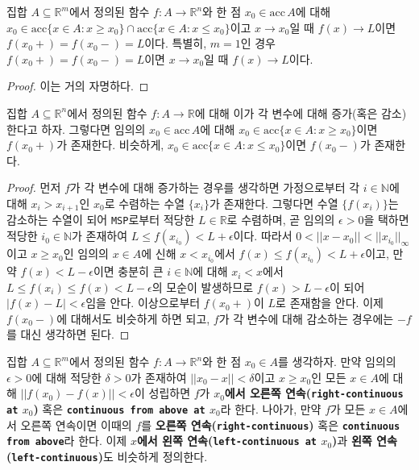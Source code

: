 \begin{proposition}
    집합 $A\subseteq\mathbb{R}^m$에서 정의된 함수 $f:A\to\mathbb{R}^n$와 한 점 $x_0\in\mathrm{acc}\,A$에 대해 $x_0\in\mathrm{acc}\{x\in A:x\geq x_0\}\cap\mathrm{acc}\{x\in A:x\leq x_0\}$이고 $x\to x_0$일 때 $f(x)\to L$이면 $f(x_0+)=f(x_0-)=L$이다. 특별히, $m=1$인 경우 $f(x_0+)=f(x_0-)=L$이면 $x\to x_0$일 때 $f(x)\to L$이다.
\end{proposition}

\begin{proof}
    이는 거의 자명하다.
\end{proof}

\begin{theorem}
    집합 $A\subseteq\mathbb{R}^n$에서 정의된 함수 $f:A\to\mathbb{R}$에 대해 이가 각 변수에 대해 증가(혹은 감소)한다고 하자. 그렇다면 임의의 $x_0\in\mathrm{acc}\,A$에 대해 $x_0\in\mathrm{acc}\{x\in A:x\geq x_0\}$이면 $f(x_0+)$가 존재한다. 비슷하게, $x_0\in\mathrm{acc}\{x\in A:x\leq x_0\}$이면 $f(x_0-)$가 존재한다.
\end{theorem}

\begin{proof}
    먼저 $f$가 각 변수에 대해 증가하는 경우를 생각하면 가정으로부터 각 $i\in\mathbb{N}$에 대해 $x_i>x_{i+1}$인 $x_0$로 수렴하는 수열 $\{x_i\}$가 존재한다. 그렇다면 수열 $\{f(x_i)\}$는 감소하는 수열이 되어 \texttt{MSP}로부터 적당한 $L\in\mathbb{R}$로 수렴하며, 곧 임의의 $\epsilon>0$을 택하면 적당한 $i_0\in\mathbb{N}$가 존재하여 $L\leq f(x_{i_0})<L+\epsilon$이다. 따라서 $0<||x-x_0||<||x_{i_0}||_\infty$이고 $x\geq x_0$인 임의의 $x\in A$에 신해 $x<x_{i_0}$에서 $f(x)\leq f(x_{i_0})<L+\epsilon$이고, 만약 $f(x)<L-\epsilon$이면 충분히 큰 $i\in\mathbb{N}$에 대해 $x_i<x$에서 $L\leq f(x_i)\leq f(x)<L-\epsilon$의 모순이 발생하므로 $f(x)>L-\epsilon$이 되어 $|f(x)-L|<\epsilon$임을 안다. 이상으로부터 $f(x_0+)$이 $L$로 존재함을 안다. 이제 $f(x_0-)$에 대해서도 비슷하게 하면 되고, $f$가 각 변수에 대해 감소하는 경우에는 $-f$를 대신 생각하면 된다.
\end{proof}

\begin{definition}
    집합 $A\subseteq\mathbb{R}^m$에서 정의된 함수 $f:A\to\mathbb{R}^n$와 한 점 $x_0\in A$를 생각하자. 만약 임의의 $\epsilon>0$에 대해 적당한 $\delta>0$가 존재하여 $||x_0-x||<\delta$이고 $x\geq x_0$인 모든 $x\in A$에 대해 $||f(x_0)-f(x)||<\epsilon$이 성립하면 $f$가 \textbf{$x_0$에서 오른쪽 연속(\texttt{right-continuous at} $x_0$)} 혹은 \textbf{\texttt{continuous from above at} $x_0$}라 한다. 나아가, 만약 $f$가 모든 $x\in A$에서 오른쪽 연속이면 이때의 $f$를 \textbf{오른쪽 연속(\texttt{right-continuous})} 혹은 \textbf{\texttt{continuous from above}}라 한다. 이제 \textbf{$x$에서 왼쪽 연속(\texttt{left-continuous at} $x_0$)}과 \textbf{왼쪽 연속(\texttt{left-continuous})}도 비슷하게 정의한다.
\end{definition}

